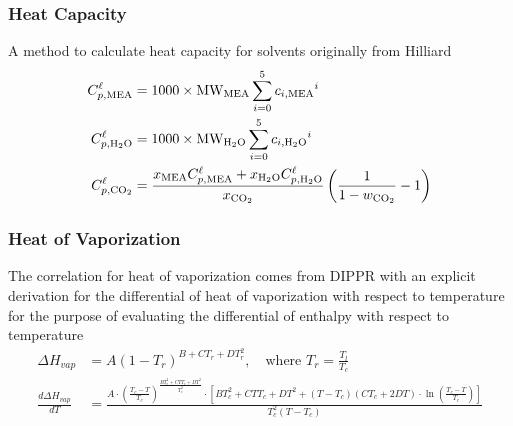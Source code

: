 \documentclass[a4paper,fleqn]{cas-sc}
\newcommand{\COtwo}{{\ce{CO2}}}
\newcommand{\HtwoO}{{\ce{H2O}}}
\newcommand{\MEA}{{\ce{MEA}}}
\newcommand{\liq}{\ell}
\begin{document}
    \subsubsection{Heat Capacity}
    A method to calculate heat capacity for solvents originally from Hilliard \cite{Hillard2008}
    \begin{align}
        C^{\liq}_{p,\MEA} &= 1000 \times \text{\text{MW}}_{\MEA} \sum_{i=0}^{5} {c_{i, \MEA}}^{i} \\
        C^{\liq}_{p,\HtwoO} &= 1000 \times \text{\text{MW}}_{\HtwoO} \sum_{i=0}^{5} {c_{i, \HtwoO}}^{i} \\
        C^{\liq}_{p,\COtwo} &= \frac{x_{\MEA} C^{\liq}_{p,\MEA} + x_{\HtwoO} C^{\liq}_{p,\HtwoO}}{x_{\COtwo}} \left( \frac{1}{1 - w_{\COtwo}} - 1\right)
    \end{align}

    \subsubsection{Heat of Vaporization}
    The correlation for heat of vaporization comes from DIPPR \cite{DIPPR2005} with an explicit derivation for the differential of heat of vaporization with respect to temperature for the purpose of evaluating the differential of enthalpy with respect to temperature
    \begin{align}
        \Delta H_{vap} &= A (1 - T_r)^{B + C T_r + D T_r^2}, \quad \text{where } T_r = \frac{T_l}{T_c} \\
        \frac{d\Delta H_{vap}}{dT} &= \frac{A \cdot \left( \frac{T_c - T}{T_c} \right)^{\frac{BT_c^2 + CTT_c + DT^2}{T_c^2}} \cdot \left[ BT_c^2 + CTT_c + DT^2 + (T - T_c)(CT_c + 2DT) \cdot \ln\left( \frac{T_c - T}{T_c} \right) \right]}{T_c^2(T - T_c)}
    \end{align}
\end{document}
